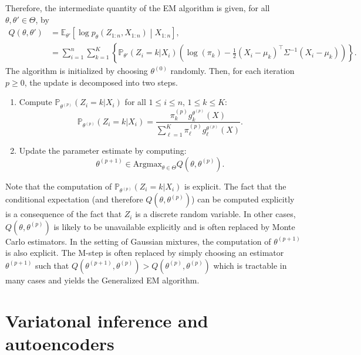 \documentclass[english,graybox,envcountchap,envcountsame,sectrefs,shortlabels]{svmono}
\theoremstyle{style}
\newcommand{\eqsp}{}
\begin{document}
Therefore, the intermediate quantity of the EM algorithm is given, for all $\theta,\theta' \in\Theta$, by
\begin{align*}
Q(\theta,\theta') &= \mathbb{E}_{\theta'} \left[\log p_\theta (Z_{1:n},X_{1:n}) \middle | X_{1:n}\right]\eqsp,\\
&= \sum_{i=1}^n \sum_{k=1}^K \left\{ \mathbb{P}_{\theta'}(Z_i = k|X_i)\left( \log(\pi_k) -\frac{1}{2}(X_i - \mu_{k})^\top \Sigma^{-1}(X_i - \mu_{k})\right) \right\} \eqsp.%
\end{align*}
The algorithm is initialized by choosing $\theta^{(0)}$ randomly. Then, for each iteration $p\geq 0$, the update is decomposed into two steps.
\begin{enumerate}
\item Compute $\mathbb{P}_{\theta^{(p)}}(Z_i = k|X_i)$ for all $1\leq i \leq n$, $1\leq k \leq K$:
$$
\mathbb{P}_{\theta^{(p)}}(Z_i = k|X_i) = \frac{\pi^{(p)}_kg^{\theta^{(p)}}_k(X)}{\sum_{\ell=1}^{K}\pi^{(p)}_\ell g^{\theta^{(p)}}_\ell(X)}\eqsp.
$$
\item Update the parameter estimate by computing:
$$
\theta^{(p+1)} \in \mathrm{Argmax}_{\theta\in\Theta} Q(\theta,\theta^{(p)})\eqsp.
$$
\end{enumerate}
Note that the computation of $\mathbb{P}_{\theta^{(p)}}(Z_i = k|X_i) $ is explicit. The fact that the conditional expectation (and therefore $Q(\theta,\theta^{(p)})$) can be computed explicitly is a consequence of the fact that $Z_i$ is a discrete random variable. In other cases, $Q(\theta,\theta^{(p)})$ is likely to be unavailable explicitly and is often replaced by Monte Carlo estimators. In the setting of Gaussian mixtures, the computation of $\theta^{(p+1)}$ is also explicit. The M-step is often replaced by simply choosing an estimator $\theta^{(p+1)}$ such that $Q(\theta^{(p+1)},\theta^{(p)}) > Q(\theta^{(p)},\theta^{(p)})$  which is tractable in many cases and yields the Generalized EM algorithm.

\chapter{Variatonal inference and autoencoders}
\end{document}
